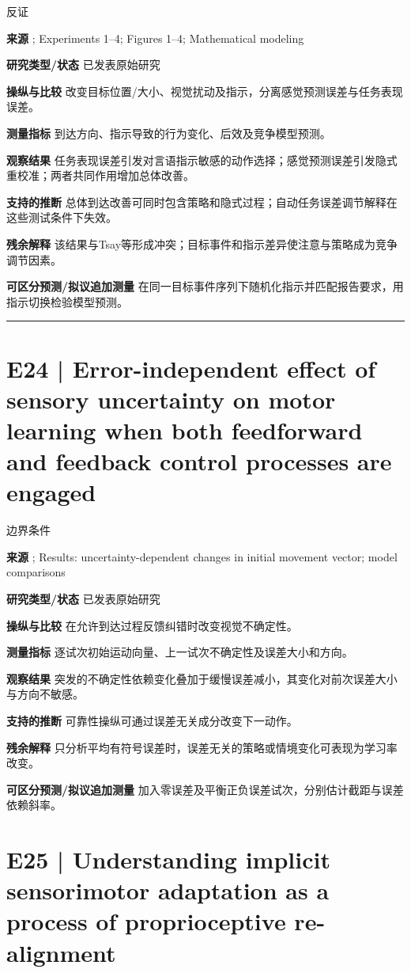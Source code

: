 \documentclass[11pt,a4paper]{article}
\begin{document}
{\small\sffamily\color{navy} 反证}\par
\textbf{来源} \cite{oza2024}; Experiments 1--4; Figures 1--4; Mathematical modeling\par
\textbf{研究类型/状态} 已发表原始研究\par
\textbf{操纵与比较} 改变目标位置/大小、视觉扰动及指示，分离感觉预测误差与任务表现误差。\par
\textbf{测量指标} 到达方向、指示导致的行为变化、后效及竞争模型预测。\par
\textbf{观察结果} 任务表现误差引发对言语指示敏感的动作选择；感觉预测误差引发隐式重校准；两者共同作用增加总体改善。\par
\textbf{支持的推断} 总体到达改善可同时包含策略和隐式过程；自动任务误差调节解释在这些测试条件下失效。\par
\textbf{残余解释} 该结果与Tsay等形成冲突；目标事件和指示差异使注意与策略成为竞争调节因素。\par
\textbf{可区分预测/拟议追加测量} 在同一目标事件序列下随机化指示并匹配报告要求，用指示切换检验模型预测。\par
\bigskip\hrule\medskip\section{E24 | Error-independent effect of sensory uncertainty on motor learning when both feedforward and feedback control processes are engaged}
{\small\sffamily\color{navy} 边界条件}\par
\textbf{来源} \cite{uncertain2023}; Results: uncertainty-dependent changes in initial movement vector; model comparisons\par
\textbf{研究类型/状态} 已发表原始研究\par
\textbf{操纵与比较} 在允许到达过程反馈纠错时改变视觉不确定性。\par
\textbf{测量指标} 逐试次初始运动向量、上一试次不确定性及误差大小和方向。\par
\textbf{观察结果} 突发的不确定性依赖变化叠加于缓慢误差减小，其变化对前次误差大小与方向不敏感。\par
\textbf{支持的推断} 可靠性操纵可通过误差无关成分改变下一动作。\par
\textbf{残余解释} 只分析平均有符号误差时，误差无关的策略或情境变化可表现为学习率改变。\par
\textbf{可区分预测/拟议追加测量} 加入零误差及平衡正负误差试次，分别估计截距与误差依赖斜率。\par
\clearpage\section{E25 | Understanding implicit sensorimotor adaptation as a process of proprioceptive re-alignment}
\end{document}

